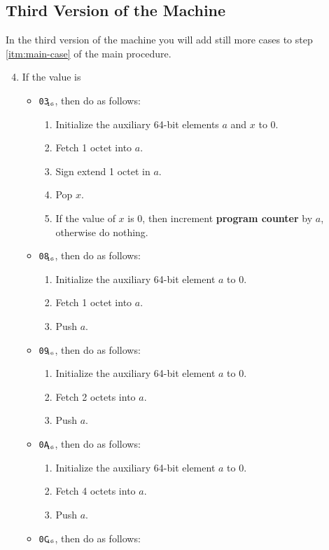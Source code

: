 \documentclass[a4paper,12pt]{article}
\newcommand{\num}[1]{\texttt{#1}\xspace}
\newcommand{\hex}[1]{\num{#1}$_{\textup{\tiny\hskip-1ex 16}}$\xspace}
\newcommand{\PC}{\textbf{program counter}\xspace}
\newcommand{\op}[1]{#1}
\newcommand{\JUMPZERO}  [1]{\op{\hex{03}}}
\newcommand{\PUSHB}     [1]{\op{\hex{08}}}
\newcommand{\PUSHS}     [1]{\op{\hex{09}}}
\newcommand{\PUSHI}     [1]{\op{\hex{0A}}}
\newcommand{\SIGXB}     [1]{\op{\hex{0C}}}
\begin{document}
\subsection{Third Version of the Machine}

In the third version of the machine you will add still more cases to step \ref{itm:main-case} of the main procedure.

\begin{enumerate}
  \setcounter{enumi}{3}
\item If the value is
  \begin{itemize}
  \item \JUMPZERO{}, then do as follows:
    \begin{enumerate}
    \item Initialize the auxiliary 64-bit elements $a$ and $x$ to 0.
    \item Fetch 1 octet into $a$.
    \item Sign extend 1 octet in $a$.
    \item Pop $x$.
    \item If the value of $x$ is 0, then increment \PC by $a$, otherwise do nothing.
    \end{enumerate}
  \item \PUSHB{}, then do as follows:
    \begin{enumerate}
    \item Initialize the auxiliary 64-bit element $a$ to 0.
    \item Fetch 1 octet into $a$.
    \item Push $a$.
    \end{enumerate}
  \item \PUSHS{}, then do as follows:
    \begin{enumerate}
    \item Initialize the auxiliary 64-bit element $a$ to 0.
    \item Fetch 2 octets into $a$.
    \item Push $a$.
    \end{enumerate}
  \item \PUSHI{}, then do as follows:
    \begin{enumerate}
    \item Initialize the auxiliary 64-bit element $a$ to 0.
    \item Fetch 4 octets into $a$.
    \item Push $a$.
    \end{enumerate}
  \item \SIGXB{}, then do as follows:

\end{itemize}
\end{enumerate}
\end{document}
